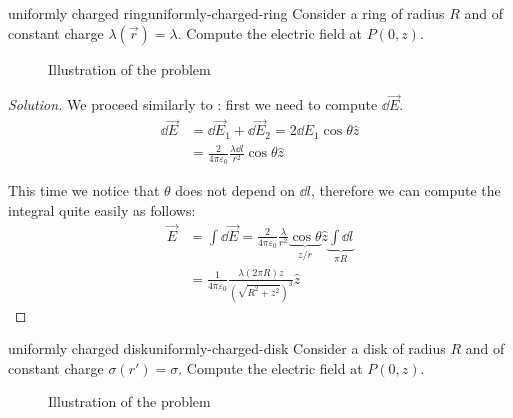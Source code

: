 \documentclass[12pt]{extarticle}
\begin{document}
\begin{example}{uniformly charged ring}{uniformly-charged-ring}
	Consider a ring of radius $R$ and of constant charge $\lambda(\vec r) = \lambda$.
	Compute the electric field at $P(0,z)$.

	\begin{figure}[H]
		\centering
		
		\caption{Illustration of the problem}
	\end{figure}
\end{example}

\begin{proof}[Solution]
	We proceed similarly to : first we need to compute $\dd{\vec E}$.
	\begin{align}
		\dd{\vec E} & = \dd{\vec E_1} + \dd{\vec E_2} = 2 \dd{E_1} \cos \theta \hat z               \\
		            & = \frac{2}{4 \pi \varepsilon_0} \frac{\lambda \dd{l}}{r^2} \cos \theta \hat z
	\end{align}

	This time we notice that $\theta$ does not depend on $\dd{l}$, therefore we can compute the integral quite easily as follows:
	\begin{align}
		\vec E & = \int \dd{\vec E} = \frac{2}{4 \pi \varepsilon_0} \frac{\lambda}{r^2} \underbrace{\cos \theta}_{z/r} \hat z \underbrace{\int \dd{l}}_{\pi R} \\
		       & = \frac{1}{4 \pi \varepsilon_0} \frac{\lambda (2\pi R) z}{\left(\sqrt{R^2 + z^2}\right)^3} \hat z
	\end{align}
\end{proof}

\begin{example}{uniformly charged disk}{uniformly-charged-disk}
	Consider a disk of radius $R$ and of constant charge $\sigma(r') = \sigma$.
	Compute the electric field at $P(0,z)$.

	\begin{figure}[H]
		\centering
		
		\caption{Illustration of the problem}
	\end{figure}
\end{example}
\end{document}
